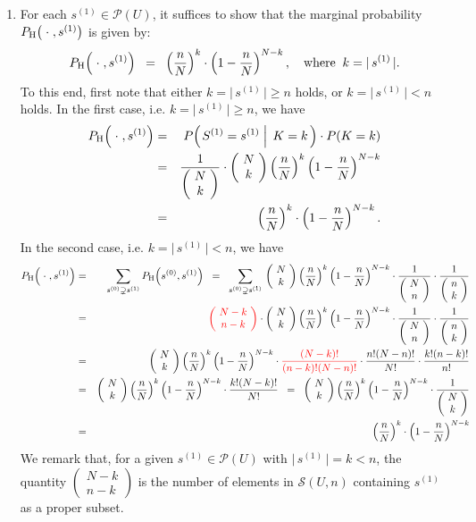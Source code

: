 \begin{enumerate}
\item
For each $s^{(1)} \in \mathcal{P}(U)$, it suffices to show that the marginal probability
$P_{\textnormal{H}}\!\left(\;\cdot\;,s^{(1)}\right)$
is given by:
\begin{equation*}
P_{\textnormal{H}}\!\left(\;\cdot\;,s^{(1)}\right) \;\; = \;\; \left(\dfrac{n}{N}\right)^{k} \cdot \left(1 - \dfrac{n}{N}\right)^{N-k},
\quad\textnormal{where}\;\; k = \vert\,s^{(1)}\,\vert.
\end{equation*}
To this end, first note that either $k = \vert\,s^{(1)}\,\vert \geq n$ holds, or $k = \vert\,s^{(1)}\,\vert < n$ holds.
In the first case, i.e. $k = \vert\,s^{(1)}\,\vert \geq n$, we have
\begin{eqnarray*}
P_{\textnormal{H}}\!\left(\;\cdot\;,s^{(1)}\right)
&=&P\!\left(\left.S^{(1)} = s^{(1)}\;\right\vert\;K = k\,\right) \cdot P(K = k)
\\
&=& \dfrac{1}{\left(\!\begin{array}{c} N \\ k \end{array}\!\right)} \cdot \left(\!\begin{array}{c}N \\ k\end{array}\!\right)\left(\dfrac{n}{N}\right)^{k}\left(1 - \dfrac{n}{N}\right)^{N-k}
\\
&=& \left(\dfrac{n}{N}\right)^{k} \cdot \left(1 - \dfrac{n}{N}\right)^{N-k}.
\end{eqnarray*}
In the second case, i.e. $k = \vert\,s^{(1)}\,\vert < n$, we have
\begin{eqnarray*}
P_{\textnormal{H}}\!\left(\;\cdot\;,s^{(1)}\right)
&=& \underset{s^{(0)} \supsetneq s^{(1)}}{\sum}\,P_{\textnormal{H}}\!\left(s^{(0)},s^{(1)}\right)
\;\; = \;\; \underset{s^{(0)} \supsetneq s^{(1)}}{\sum}\,\PKk\cdot\dfrac{1}{\NCn}\cdot\dfrac{1}{\nCk}
\\
&=& {\color{red}\left(\!\begin{array}{c} N-k \\ n-k \end{array}\!\right)}\cdot\PKk\cdot\dfrac{1}{\NCn}\cdot\dfrac{1}{\nCk}
\\
&=& \PKk\cdot{\color{red}\dfrac{(N-k)!}{(n-k)!(N-n)!}} \cdot\dfrac{n!(N-n)!}{N!}\cdot\dfrac{k!(n-k)!}{n!}
\\
&=& \PKk\cdot\dfrac{k!(N-k)!}{N!} \;\; = \;\; \PKk\cdot\dfrac{1}{\NCk}
\\
&=& \left(\dfrac{n}{N}\right)^{k} \cdot \left(1 - \dfrac{n}{N}\right)^{N-k}
\end{eqnarray*}
We remark that, for a given $s^{(1)} \in \mathcal{P}(U)$ with $\vert\,s^{(1)}\,\vert = k < n$,
the quantity $\left(\!\begin{array}{c} N - k \\ n - k \end{array}\!\right)$
is the number of elements in $\mathcal{S}(U,n)$ containing $s^{(1)}$ as a proper subset.


\end{enumerate}
